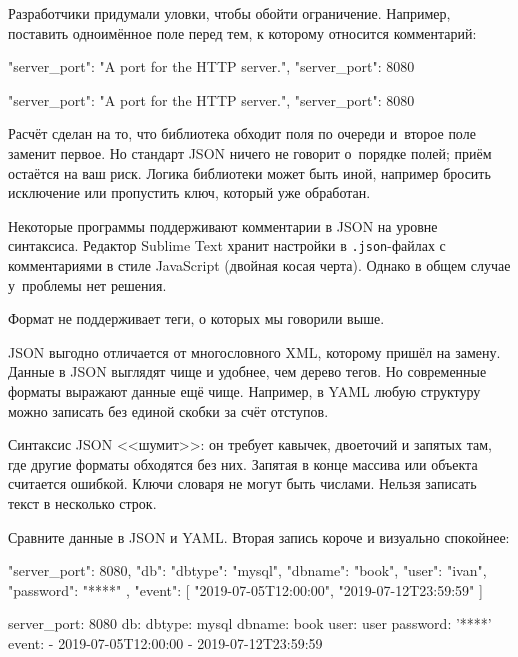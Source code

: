 Разработчики придумали уловки, чтобы обойти ограничение. Например, поставить
одноимённое поле перед тем, к которому относится комментарий:

\ifnarrow

\begin{english}
  \begin{json}
{
    "server_port":
    "A port for the HTTP server.",
    "server_port": 8080
}
  \end{json}
\end{english}

\else

\begin{english}
  \begin{json}
{
    "server_port": "A port for the HTTP server.",
    "server_port": 8080
}
  \end{json}
\end{english}
\fi


Расчёт сделан на то, что библиотека обходит поля по очереди и~второе поле
заменит первое. Но стандарт JSON ничего не говорит о~порядке полей; приём
остаётся на ваш риск. Логика библиотеки может быть иной, например бросить
исключение или пропустить ключ, который уже обработан.

Некоторые программы поддерживают комментарии в JSON на уровне синтаксиса.
Редактор Sublime Text хранит настройки в \verb|.json|-файлах с комментариями в
стиле JavaScript (двойная косая черта).  Однако в общем случае у~проблемы нет
решения.


Формат не поддерживает теги, о которых мы говорили выше.

JSON выгодно отличается от многословного XML, которому пришёл на замену. Данные
в JSON выглядят чище и удобнее, чем дерево тегов. Но современные форматы
выражают данные ещё чище. Например, в YAML любую структуру можно записать без
единой скобки за счёт отступов.

Синтаксис JSON <<шумит>>: он требует кавычек, двоеточий и запятых там, где
другие форматы обходятся без них. Запятая в конце массива или объекта считается
ошибкой. Ключи словаря не могут быть числами. Нельзя записать текст в несколько
строк.

Сравните данные в JSON и YAML. Вторая запись короче и визуально спокойнее:

\ifnarrow

\begin{english}
  \begin{json}
{
    "server_port": 8080,
    "db": {
        "dbtype":   "mysql",
        "dbname":   "book",
        "user":     "ivan",
        "password": "****"
    },
    "event": [
        "2019-07-05T12:00:00",
        "2019-07-12T23:59:59"
    ]
}
  \end{json}

\splitter

  \begin{yaml}
server_port: 8080
db:
  dbtype:   mysql
  dbname:   book
  user:     user
  password: '****'
event:
  - 2019-07-05T12:00:00
  - 2019-07-12T23:59:59
  \end{yaml}
\end{english}

